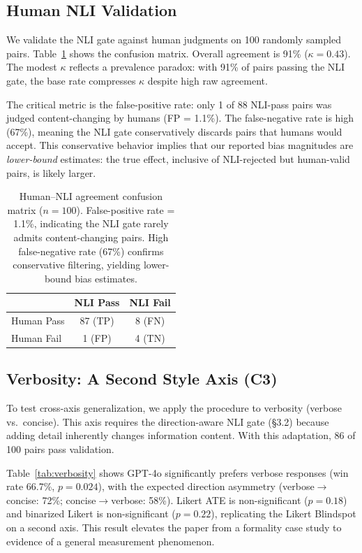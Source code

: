 \documentclass[11pt]{article}
\begin{document}
\subsection{Human NLI Validation}
\label{sec:human_nli}

We validate the NLI gate against human judgments on 100 randomly sampled pairs.
Table~\ref{tab:human_nli} shows the confusion matrix.
Overall agreement is 91\% ($\kappa = 0.43$).
The modest $\kappa$ reflects a prevalence paradox: with 91\% of pairs passing the NLI gate, the base rate compresses $\kappa$ despite high raw agreement.

The critical metric is the false-positive rate: only 1 of 88 NLI-pass pairs was judged content-changing by humans (FP = 1.1\%).
The false-negative rate is high (67\%), meaning the NLI gate conservatively discards pairs that humans would accept.
This conservative behavior implies that our reported bias magnitudes are \emph{lower-bound} estimates: the true effect, inclusive of NLI-rejected but human-valid pairs, is likely larger.

\begin{table}[t]
\centering
\small
\begin{tabular}{lcc}
\toprule
& \textbf{NLI Pass} & \textbf{NLI Fail} \\
\midrule
Human Pass & 87 (TP) & 8 (FN) \\
Human Fail & 1 (FP) & 4 (TN) \\
\bottomrule
\end{tabular}
\caption{Human--NLI agreement confusion matrix ($n = 100$). False-positive rate = 1.1\%, indicating the NLI gate rarely admits content-changing pairs. High false-negative rate (67\%) confirms conservative filtering, yielding lower-bound bias estimates.}
\label{tab:human_nli}
\end{table}

\subsection{Verbosity: A Second Style Axis (C3)}
\label{sec:verbosity}

To test cross-axis generalization, we apply the procedure to verbosity (verbose vs.\ concise).
This axis requires the direction-aware NLI gate (\S3.2) because adding detail inherently changes information content.
With this adaptation, 86 of 100 pairs pass validation.

Table~\ref{tab:verbosity} shows GPT-4o significantly prefers verbose responses (win rate 66.7\%, $p = 0.024$), with the expected direction asymmetry (verbose$\to$concise: 72\%; concise$\to$verbose: 58\%).
Likert ATE is non-significant ($p = 0.18$) and binarized Likert is non-significant ($p = 0.22$), replicating the Likert Blindspot on a second axis.
This result elevates the paper from a formality case study to evidence of a general measurement phenomenon.
\end{document}
